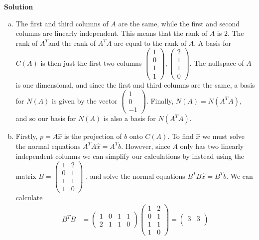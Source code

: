 \documentclass[11pt]{article}
\begin{document}
\noindent \textbf{Solution}\\
\begin{enumerate}[(a)]
\item The first and third columns of $A$ are the same, while the first
and second columns are linearly independent. This means that the rank
of $A$ is $2$. The rank of $A^{T}$and the rank of $A^{T}A$ are
equal to the rank of $A$. A basis for $C(A)$ is then just the first
two columns $\begin{pmatrix}1\\
0\\
1\\
1
\end{pmatrix},\begin{pmatrix}2\\
1\\
1\\
0
\end{pmatrix}$. The nullspace of $A$ is one dimensional, and since the first and
third columns are the same, a basis for $N(A)$ is given by the vector
$\begin{pmatrix}1\\
0\\
-1
\end{pmatrix}.$ Finally, $N(A)=N(A^{T}A)$, and so our basis for $N(A)$ is also
a basis for $N(A^{T}A).$ 
\item Firstly, $p=A\hat{{x}}$ is the projection of $b$ onto $C(A)$. To
find $\hat{{x}}$ we must solve the normal equations $A^{T}A\hat{x}=A^{T}b$.
However, since $A$ only has two linearly independent columns we can
simplify our calculations by instead using the matrix $B=\begin{pmatrix}1 & 2\\
0 & 1\\
1 & 1\\
1 & 0
\end{pmatrix}$ , and solve the normal equations $B^{T}B\hat{x}=B^{T}b.$ We can
calculate 
\begin{align*}
B^{T}B & =\begin{pmatrix}1 & 0 & 1 & 1\\
2 & 1 & 1 & 0
\end{pmatrix}\begin{pmatrix}1 & 2\\
0 & 1\\
1 & 1\\
1 & 0
\end{pmatrix}=\begin{pmatrix}3 & 3\\

\end{pmatrix}
\end{align*}
\end{enumerate}
\end{document}
